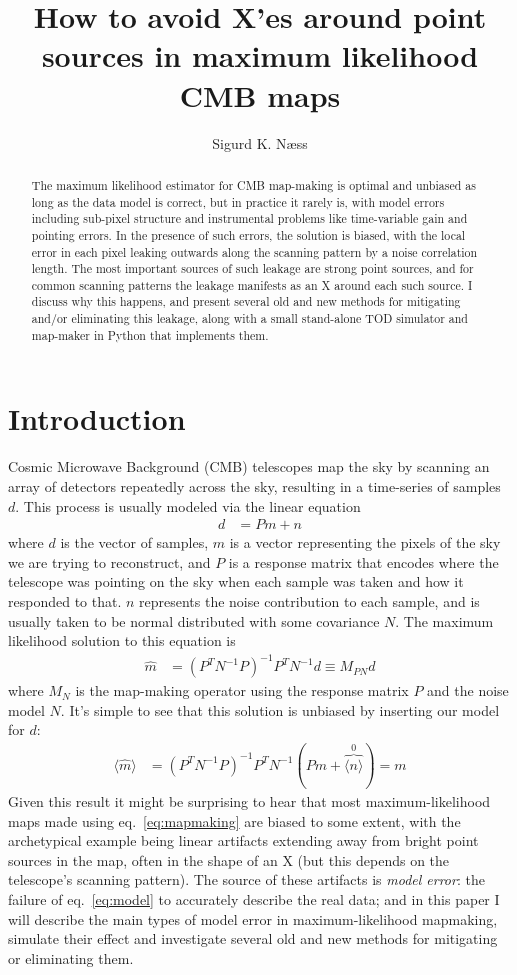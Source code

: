 \documentclass{article}
\title{How to avoid X'es around point sources in maximum likelihood CMB maps}
\author[1]{Sigurd K. Næss}
\affil[1]{Center for Computational Astrophysics, Flatiron Institute}
\begin{document}
\maketitle
\begin{abstract}
	The maximum likelihood estimator for CMB map-making is optimal and unbiased as long as
	the data model is correct, but in practice it rarely is, with model errors including
	sub-pixel structure and instrumental problems like time-variable gain and pointing errors.
	In the presence of such errors, the solution is biased, with the local error in each pixel
	leaking outwards along the scanning pattern by a noise correlation length. The most important
	sources of such leakage are strong point sources, and for common scanning patterns the leakage
	manifests as an X around each such source. I discuss why this happens, and present several
	old and new methods for mitigating and/or eliminating this leakage, along with a small
	stand-alone TOD simulator and map-maker in Python that implements them.
\end{abstract}

\section{Introduction}
Cosmic Microwave Background (CMB) telescopes map the sky by scanning an array of detectors repeatedly across
the sky, resulting in a time-series of samples $d$. This process is usually
modeled via the linear equation \citep{tegmark/map/1997}
\begin{align}
d &= Pm + n \label{eq:model}
\end{align}
where $d$ is the vector of samples,
$m$ is a vector representing the pixels of the sky we are trying to reconstruct, and
$P$ is a response matrix that encodes where the telescope was pointing on the sky
when each sample was taken and how it responded to that. $n$ represents the
noise contribution to each sample, and is usually taken to be normal distributed
with some covariance $N$. The maximum likelihood solution to this equation is
\begin{align}
	\hat m &= (P^T N^{-1} P)^{-1} P^T N^{-1} d \equiv M_{PN} d \label{eq:mapmaking}
\end{align}
where $M_N$ is the map-making operator using the response matrix $P$ and the noise model $N$.
It's simple to see that this solution is unbiased by inserting our model for $d$:
\begin{align}
\langle \hat m \rangle &= (P^T N^{-1} P)^{-1}P^T N^{-1}(Pm + \overbrace{\langle n \rangle}^{0}) = m
\end{align}
Given this result it might be surprising to hear that most maximum-likelihood maps
made using eq.~\ref{eq:mapmaking} are biased to some extent, with the archetypical example
being linear artifacts extending away from bright point sources in the map, often in the shape of an X
(but this depends on the telescope's scanning pattern). The source of these artifacts is \emph{model
error}: the failure of eq.~\ref{eq:model} to accurately describe the real data; and
in this paper I will describe the main types of model error in maximum-likelihood mapmaking, simulate their
effect and investigate several old and new methods for mitigating or eliminating them.
\end{document}
